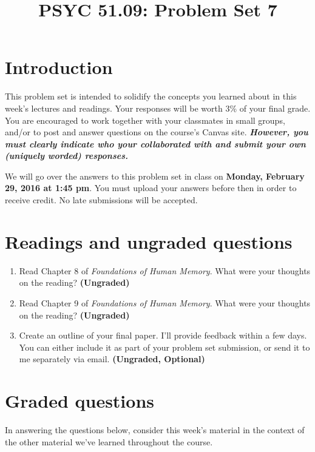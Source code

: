 \documentclass[11pt]{article}
\title{PSYC 51.09: Problem Set 7}
\date{}
\begin{document}
\maketitle
\vspace{-0.75in}
\section*{Introduction}
This problem set is intended to solidify the concepts you learned about in this week's lectures and readings.  Your responses will be worth 3\% of your final grade.  You are encouraged to work together with your classmates in small groups, and/or to post and answer questions on the course’s Canvas site.  \textbf{\textit{However, you must clearly indicate who your collaborated with and submit your own (uniquely worded) responses.}}

We will go over the answers to this problem set in class on \textbf{Monday, February 29, 2016 at 1:45 pm}.  You must upload your answers before then in order to receive credit.  No late submissions will be accepted.

\section*{Readings and ungraded questions}
\begin{enumerate}
\item Read Chapter 8 of \textit{Foundations of Human Memory}.  What were your thoughts on the reading?
  \textbf{(Ungraded)}

\item Read Chapter 9 of \textit{Foundations of Human Memory}.  What were your thoughts on the reading?
  \textbf{(Ungraded)}

\item Create an outline of your final paper.  I'll provide feedback
  within a few days.  You can either include it as part of your
  problem set submission,
  or send it to me separately via email.
  \textbf{(Ungraded, Optional)}
\end{enumerate}

\section*{Graded questions}
In answering the questions below, consider this week's material in the
context of the other material we've learned throughout the course.
\end{document}
